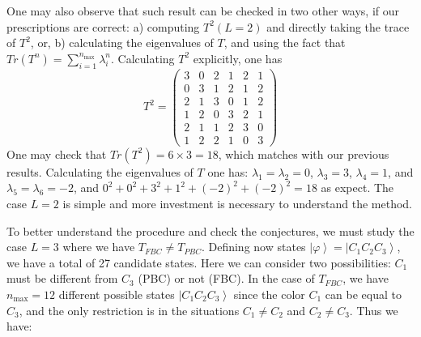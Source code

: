 \documentclass[3p, 10pt, onecolumn]{elsarticle}
\begin{document}
One may also observe that such result can be checked in two other ways, if
our prescriptions are correct: a) computing $T^{2}(L=2)$ and directly taking
the trace of $T^{2}$, or, b) calculating the eigenvalues of $T$, and using
the fact that $Tr(T^{n})=\sum_{i=1}^{n_{\max }}\lambda _{i}^{n}$.
Calculating $T^{2}$ explicitly, one has 
\begin{equation}
T^{2}=\left(\allowbreak 
\begin{array}{cccccc}
3 & 0 & 2 & 1 & 2 & 1 \\ 
0 & 3 & 1 & 2 & 1 & 2 \\ 
2 & 1 & 3 & 0 & 1 & 2 \\ 
1 & 2 & 0 & 3 & 2 & 1 \\ 
2 & 1 & 1 & 2 & 3 & 0 \\ 
1 & 2 & 2 & 1 & 0 & 3%
\end{array}%
\right) \allowbreak
\end{equation}%
One may check that $Tr(T^{2})=6\times 3=18$, which matches with our previous
results. Calculating the eigenvalues of $T$ one has: $\lambda _{1}=\lambda
_{2}=0$, $\lambda _{3}=3$, $\lambda _{4}=1$, and $\lambda _{5}=\lambda
_{6}=-2$, and $0^{2}+0^{2}+3^{2}+1^{2}+(-2)^{2}+(-2)^{2}=18$ as expect. The
case $L=2$ is simple and more investment is necessary to understand the
method.

To better understand the procedure and check the conjectures, we must study
the case $L=3$ where we have $T_{FBC}\neq T_{PBC}$. Defining now states $%
\left\vert \varphi \right\rangle =\left\vert C_{1}C_{2}C_{3}\right\rangle $,
we have a total of 27 candidate states. Here we can consider two
possibilities: $C_{1}$ must be different from $C_{3}$ (PBC) or not (FBC). In
the case of $T_{FBC}$, we have $n_{\max }=12$ different possible states $%
\left\vert C_{1}C_{2}C_{3}\right\rangle $ since the color $C_{1}$ can be
equal to $C_{3} $, and the only restriction is in the situations $C_{1}\neq
C_{2}$ and $C_{2}\neq C_{3}$. Thus we have:
\end{document}
